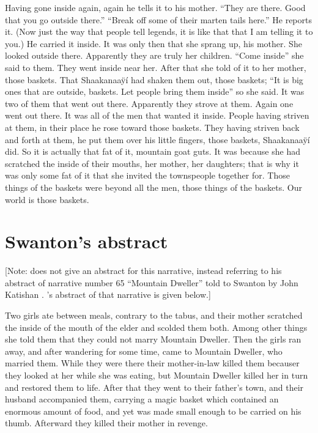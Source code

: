 \begin{pairs}
\begin{Rightside}
Having gone inside again, again he tells it to his mother.
\qqk{}“They are there.
Good that you go outside there.”
\qqk{}“Break off some of their marten tails here.”
He reports it.
(Now just the way that people tell legends, it is like that that I am telling it to you.)
He carried it inside.
It was only then that she sprang up, his mother.
She looked outside there.
Apparently they are truly her children.
\qqk{}“Come inside”
she said to them.
They went inside near her.
After that she told of it to her mother, those baskets.
That Shaakanaaÿí had shaken them out, those baskets;
\qqk{}“It is big ones that are outside, baskets.
Let people bring them inside”
so she said.
It was two of them that went out there.
Apparently they strove at them.
Again one went out there.
It was all of the men that wanted it inside.
People having striven at them, in their place he rose toward those baskets.
They having striven back and forth at them, he put them over his little fingers, those baskets, Shaakanaaÿí did.
So it is actually that fat of it, mountain goat guts.
It was because she had scratched the inside of their mouths, her mother, her daughters;
that is why it was only some fat of it that she invited the townspeople together for.
Those things of the baskets were beyond all the men, those things of the baskets.
Our world is those baskets.
\pend
\endnumbering
\end{Rightside}
\end{pairs}
\Columns


\section{Swanton’s abstract}\label{sec:92-swanton-abstract}

{}[Note: \citeauthor{swanton:1909} does not give an abstract for this narrative, instead referring to his abstract of narrative number 65 “Mountain Dweller” told to Swanton by  John Katishan \parencite[222–224]{swanton:1909}.
\citeauthor{swanton:1909}’s abstract of that narrative \parencite[441]{swanton:1909} is given below.]

Two girls ate between meals, contrary to the tabus, and their mother scratched the inside of the mouth of the elder and scolded them both.
Among other things she told them that they could not marry Mountain Dweller.
Then the girls ran away, and after wandering for some time, came to Mountain Dweller, who married them.
While they were there their mother-in-law killed them becauser they looked at her while she was eating, but Mountain Dweller killed her in turn and restored them to life.
After that they went to their father’s town, and their husband accompanied them, carrying a magic basket which contained an enormous amount of food, and yet was made small enough to be carried on his thumb.
Afterward they killed their mother in revenge.

